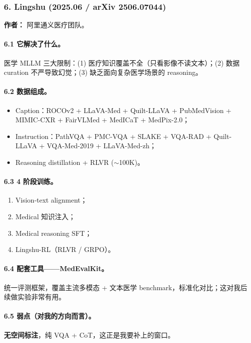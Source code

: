 \subsubsection*{6. Lingshu (2025.06 / arXiv 2506.07044)}

\textbf{作者：} 阿里通义医疗团队。

\paragraph{6.1 它解决了什么。}

医学 MLLM 三大限制：(1) 医疗知识覆盖不全（只看影像不读文本）；(2) 数据 curation 不严导致幻觉；(3) 缺乏面向复杂医学场景的 reasoning。

\paragraph{6.2 数据组成。}

\begin{itemize}[leftmargin=1.5em]
  \item Caption：ROCOv2 + LLaVA-Med + Quilt-LLaVA + PubMedVision + MIMIC-CXR + FairVLMed + MedICaT + MedPix-2.0；
  \item Instruction：PathVQA + PMC-VQA + SLAKE + VQA-RAD + Quilt-LLaVA + VQA-Med-2019 + LLaVA-Med-zh；
  \item Reasoning distillation + RLVR ($\sim$100K)。
\end{itemize}

\paragraph{6.3 4 阶段训练。}
\begin{enumerate}[leftmargin=1.5em]
  \item Vision-text alignment；
  \item Medical 知识注入；
  \item Medical reasoning SFT；
  \item Lingshu-RL（RLVR / GRPO）。
\end{enumerate}

\paragraph{6.4 配套工具——MedEvalKit。}
统一评测框架，覆盖主流多模态 + 文本医学 benchmark，标准化对比；这对我后续做实验非常有用。

\paragraph{6.5 弱点（对我的方向而言）。}
\textbf{无空间标注}，纯 VQA + CoT，这正是我要补上的窗口。

